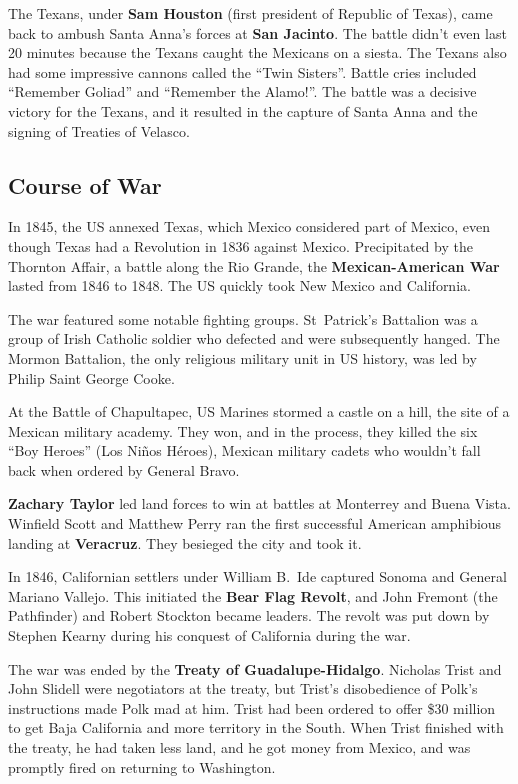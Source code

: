 The Texans, under \textbf{Sam Houston} (first president of Republic of Texas),
came back to ambush Santa Anna's forces at \textbf{San Jacinto}.
The battle didn't even last 20 minutes because the Texans caught the Mexicans on a siesta.
The Texans also had some impressive cannons called the ``Twin Sisters''.
Battle cries included ``Remember Goliad'' and ``Remember the Alamo!''.
The battle was a decisive victory for the Texans,
and it resulted in the capture of Santa Anna and the signing of Treaties of Velasco.

\subsection*{Course of War}

In 1845, the US annexed Texas, which Mexico considered part of Mexico,
even though Texas had a Revolution in 1836 against Mexico.
Precipitated by the Thornton Affair, a battle along the Rio Grande,
the \textbf{Mexican-American War} lasted from 1846 to 1848.
The US quickly took New Mexico and California.

The war featured some notable fighting groups.
St\ Patrick's Battalion was a group of Irish Catholic soldier who defected and were subsequently hanged.
The Mormon Battalion, the only religious military unit in US history, was led by Philip Saint George Cooke.

At the Battle of Chapultapec, US Marines stormed a castle on a hill, the site of a Mexican military academy.
They won, and in the process, they killed the six ``Boy Heroes'' (Los Ni\~nos H\'eroes),
Mexican military cadets who wouldn't fall back when ordered by General Bravo.

\textbf{Zachary Taylor} led land forces to win at battles at Monterrey and Buena Vista.
Winfield Scott and Matthew Perry ran the first successful American amphibious landing at \textbf{Veracruz}.
They besieged the city and took it.

In 1846, Californian settlers under William B.\ Ide captured Sonoma and General Mariano Vallejo.
This initiated the \textbf{Bear Flag Revolt}, and John Fremont (the Pathfinder) and Robert Stockton became leaders.
The revolt was put down by Stephen Kearny during his conquest of California during the war.

The war was ended by the \textbf{Treaty of Guadalupe-Hidalgo}.
Nicholas Trist and John Slidell were negotiators at the treaty,
but Trist's disobedience of Polk's instructions made Polk mad at him.
Trist had been ordered to offer \$30 million to get Baja California and more territory in the South.
When Trist finished with the treaty, he had taken less land, and he got money from Mexico,
and was promptly fired on returning to Washington.

